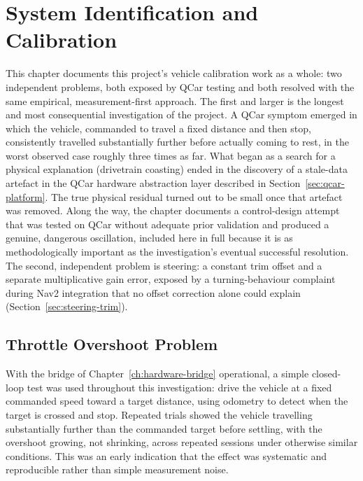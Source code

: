 \chapter{System Identification and Calibration}
\label{ch:calibration}


This chapter documents this project's vehicle calibration work as a
whole: two independent problems, both exposed by QCar
testing and both resolved with the same empirical, measurement-first
approach. The first and larger is the longest and most consequential
investigation of the project. A QCar symptom emerged in
which the vehicle, commanded to travel a fixed distance and then
stop, consistently travelled substantially further before actually
coming to rest, in the worst observed case roughly three times as far.
What began as a search for a physical explanation (drivetrain
coasting) ended in the discovery of a stale-data artefact in the
QCar hardware abstraction layer described in
Section~\ref{sec:qcar-platform}. The true physical residual turned out
to be small once that artefact was removed. Along the way, the
chapter documents a control-design attempt that was tested on
QCar without adequate prior validation and produced a
genuine, dangerous oscillation, included here in full because it is
as methodologically important as the investigation's eventual
successful resolution. The second, independent problem is steering:
a constant trim offset and a separate multiplicative gain error,
exposed by a turning-behaviour complaint during Nav2 integration
that no offset correction alone could explain
(Section~\ref{sec:steering-trim}).

\section{Throttle Overshoot Problem}
\label{sec:stop-distance-problem}

With the bridge of Chapter~\ref{ch:hardware-bridge} operational, a
simple closed-loop test was used throughout this investigation: drive
the vehicle at a fixed commanded speed toward a target distance,
using odometry to detect when the target is crossed and stop.
Repeated trials showed the vehicle travelling substantially further
than the commanded target before settling, with the overshoot
growing, not shrinking, across repeated sessions under otherwise
similar conditions. This was an early indication that the effect was
systematic and reproducible rather than simple measurement noise.

